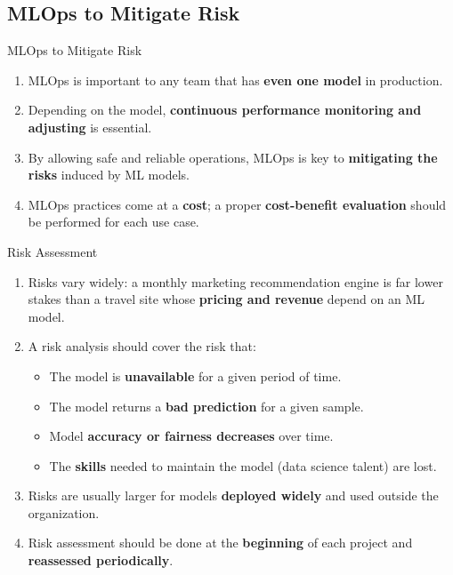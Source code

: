 \subsection{MLOps to Mitigate Risk}

\begin{frame}{MLOps to Mitigate Risk}
\begin{enumerate}
\item<1-> MLOps is important to any team that has \textbf{even one model} in production.
\item<2-> Depending on the model, \textbf{continuous performance monitoring and adjusting} is essential.
\item<3-> By allowing safe and reliable operations, MLOps is key to \textbf{mitigating the risks} induced by ML models.
\item<4-> MLOps practices come at a \textbf{cost}; a proper \textbf{cost-benefit evaluation} should be performed for each use case.
\end{enumerate}
\end{frame}

\begin{frame}{Risk Assessment}
\begin{enumerate}
\item<1-> Risks vary widely: a monthly marketing recommendation engine is far lower stakes than a travel site whose \textbf{pricing and revenue} depend on an ML model.
\item<2-> A risk analysis should cover the risk that:
    \begin{itemize}
    \item The model is \textbf{unavailable} for a given period of time.
    \item The model returns a \textbf{bad prediction} for a given sample.
    \item Model \textbf{accuracy or fairness decreases} over time.
    \item The \textbf{skills} needed to maintain the model (data science talent) are lost.
    \end{itemize}
\item<3-> Risks are usually larger for models \textbf{deployed widely} and used outside the organization.
\item<4-> Risk assessment should be done at the \textbf{beginning} of each project and \textbf{reassessed periodically}.
\end{enumerate}
\end{frame}

